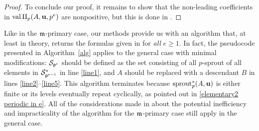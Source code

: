 \documentclass{amsart}
\begin{document}
\begin{proof}
   To conclude our proof, it remains to show that the non-leading coefficients in $\operatorname{val} \Pi_p(A,\mathbf{u},p^e)$ are nonpositive, but this is done in .
\end{proof}

\begin{remark}[An algorithm]
   \label{algorithm: R}
   Like in the $\mathfrak{m}$-primary case, our methods provide us with an algorithm that, at least in theory, returns the formulas given in  for \emph{all} $e \ge 1$.
   In fact, the pseudocode presented in Algorithm~\ref{alg} applies to the general case with minimal modifications:
   $\mathcal{S}_{\mathsf{p}^e}$ should be defined as the set consisting of all $p$-sprout of all elements in $\mathcal{S}^*_{\mathsf{p}^{e-1}}$ in line \ref{line1}, and $A$ should be replaced with a descendant $B$ in lines \ref{line2}--\ref{line5}.
   This algorithm terminates because $\operatorname{sprout}^*_p(A,\mathbf{u})$ is either finite or its levels eventually repeat cyclically, as pointed out in \eqref{elementary2 periodic in e}.
   All of the considerations made in  about the potential inefficiency and impracticality of the algorithm for the $\mathfrak{m}$-primary case still apply in the general case.
\end{remark}
\end{document}
